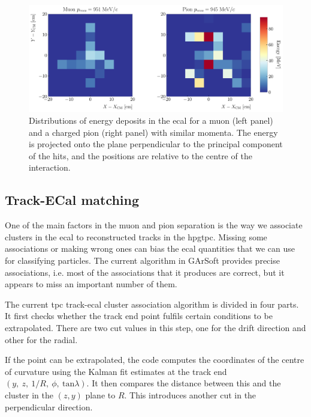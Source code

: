 \begin{figure}[t]
	\centering
	\includegraphics[width=.95\linewidth]{Images/GArSoft_PID/BDT/ecal_energy_distribution_example.pdf}
	\caption[Distributions of energy deposits in the \gls{ecal} for a muon and a charged pion with similar momenta.]{Distributions of energy deposits in the \gls{ecal} for a muon (left panel) and a charged pion (right panel) with similar momenta. The energy is projected onto the plane perpendicular to the principal component of the hits, and the positions are relative to the centre of the interaction.}
	\label{fig:ecal_example}
\end{figure}

\subsection{Track-ECal matching}

One of the main factors in the muon and pion separation is the way we associate clusters in the \gls{ecal} to reconstructed tracks in the \gls{hpgtpc}. Missing some associations or making wrong ones can bias the \gls{ecal} quantities that we can use for classifying particles. The current algorithm in GArSoft provides precise associations, i.e. most of the associations that it produces are correct, but it appears to miss an important number of them.

The current \gls{tpc} track-\gls{ecal} cluster association algorithm is divided in four parts. It first checks whether the track end point fulfils certain conditions to be extrapolated. There are two cut values in this step, one for the drift direction and other for the radial.

If the point can be extrapolated, the code computes the coordinates of the centre of curvature using the Kalman fit estimates at the track end $(y, \ z, \ 1/R, \ \phi, \ \mathrm{tan}\lambda)$. It then compares the distance between this and the cluster in the $(z,y)$ plane to $R$. This introduces another cut in the perpendicular direction.

